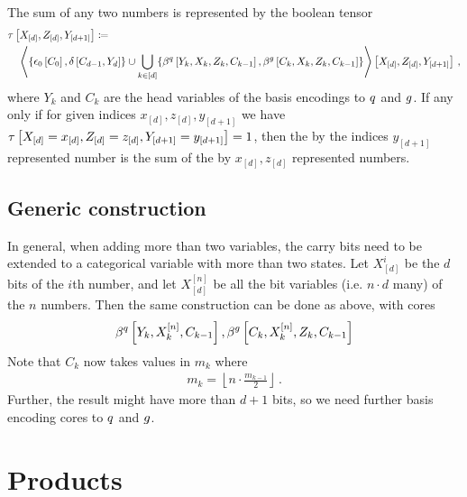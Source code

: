 \documentclass[aps,onecolumn,nofootinbib,pra]{article}
\begin{document}
    The sum of any two numbers is represented by the boolean tensor
    \begin{align*}
        &\tau\left[X_{[d]},Z_{[d]},Y_{[d+1]}\right]
        \coloneqq \\
        & \quad \left\langle \{\epsilon_{0}\left[C_0\right],\delta\left[C_{d-1},Y_{d}\right]\} \cup
            \bigcup_{k\in[d]}\{
            \beta^{q}\left[Y_{k},X_{k},Z_{k},C_{k-1}\right],
            \beta^{g}\left[C_{k},X_{k},Z_{k},C_{k-1}\right] \}
        \right\rangle \left[ X_{[d]},Z_{[d]},Y_{[d+1]} \right] \, ,
    \end{align*}
    where $Y_k$ and $C_k$ are the head variables of the basis encodings to $q$ and $g$.
    If any only if for given indices $x_{[d]},z_{[d]},y_{[d+1]}$ we have $\tau\left[X_{[d]}=x_{[d]},Z_{[d]}=z_{[d]},Y_{[d+1]}=y_{[d+1]}\right]=1$, then the by the indices $y_{[d+1]}$ represented number is the sum of the by $x_{[d]},z_{[d]}$ represented numbers.

    \subsection{Generic construction}

    In general, when adding more than two variables, the carry bits need to be extended to a categorical variable with more than two states.
    Let $X^i_{[d]}$ be the $d$ bits of the $i$th number, and let $X^{[n]}_{[d]}$ be all the bit variables (i.e. $n\cdot d$ many) of the $n$ numbers.
    Then the same construction can be done as above, with cores
    \begin{align*}
        \beta^{q}\left[Y_{k},X^{[n]}_{k},C_{k-1}\right],
        \beta^{g}\left[C_{k},X^{[n]}_{k},Z_{k},C_{k-1}\right]
    \end{align*}
    Note that $C_k$ now takes values in $m_k$ where
    \begin{align*}
        m_k = \left\lfloor n \cdot \frac{m_{k-1}}{2}\right\rfloor \, .
    \end{align*}
    Further, the result might have more than $d+1$ bits, so we need further basis encoding cores to $q$ and $g$.

    \section{Products}
\end{document}
